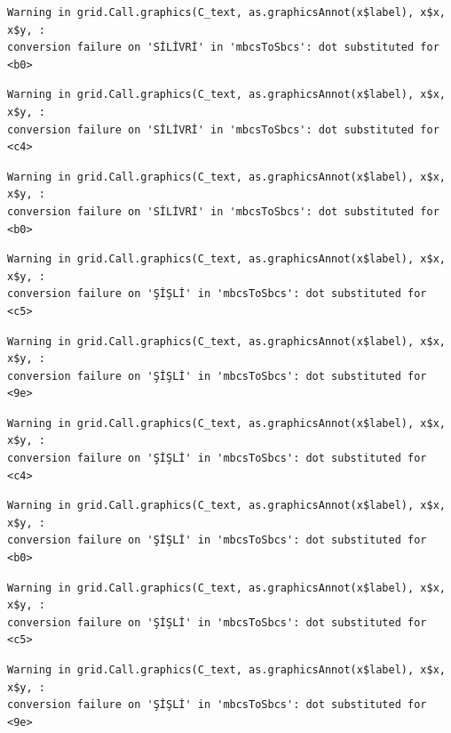 \documentclass[
  11pt,
  a4paper,
  DIV=11,
  numbers=noendperiod]{scrartcl}
\begin{document}
\begin{verbatim}
Warning in grid.Call.graphics(C_text, as.graphicsAnnot(x$label), x$x, x$y, :
conversion failure on 'SİLİVRİ' in 'mbcsToSbcs': dot substituted for <b0>
\end{verbatim}

\begin{verbatim}
Warning in grid.Call.graphics(C_text, as.graphicsAnnot(x$label), x$x, x$y, :
conversion failure on 'SİLİVRİ' in 'mbcsToSbcs': dot substituted for <c4>
\end{verbatim}

\begin{verbatim}
Warning in grid.Call.graphics(C_text, as.graphicsAnnot(x$label), x$x, x$y, :
conversion failure on 'SİLİVRİ' in 'mbcsToSbcs': dot substituted for <b0>
\end{verbatim}

\begin{verbatim}
Warning in grid.Call.graphics(C_text, as.graphicsAnnot(x$label), x$x, x$y, :
conversion failure on 'ŞİŞLİ' in 'mbcsToSbcs': dot substituted for <c5>
\end{verbatim}

\begin{verbatim}
Warning in grid.Call.graphics(C_text, as.graphicsAnnot(x$label), x$x, x$y, :
conversion failure on 'ŞİŞLİ' in 'mbcsToSbcs': dot substituted for <9e>
\end{verbatim}

\begin{verbatim}
Warning in grid.Call.graphics(C_text, as.graphicsAnnot(x$label), x$x, x$y, :
conversion failure on 'ŞİŞLİ' in 'mbcsToSbcs': dot substituted for <c4>
\end{verbatim}

\begin{verbatim}
Warning in grid.Call.graphics(C_text, as.graphicsAnnot(x$label), x$x, x$y, :
conversion failure on 'ŞİŞLİ' in 'mbcsToSbcs': dot substituted for <b0>
\end{verbatim}

\begin{verbatim}
Warning in grid.Call.graphics(C_text, as.graphicsAnnot(x$label), x$x, x$y, :
conversion failure on 'ŞİŞLİ' in 'mbcsToSbcs': dot substituted for <c5>
\end{verbatim}

\begin{verbatim}
Warning in grid.Call.graphics(C_text, as.graphicsAnnot(x$label), x$x, x$y, :
conversion failure on 'ŞİŞLİ' in 'mbcsToSbcs': dot substituted for <9e>
\end{verbatim}
\end{document}
